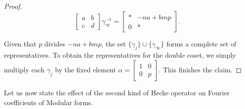 \begin{proof}
\[
\left[\begin{array}{cc}
a & b \\
c & d
\end{array}\right] \gamma_{\infty}^{-1}=\left[\begin{array}{cc}
* & -n a+b m p \\
0 & *
\end{array}\right].
\]

Given that \( p \) divides \( -n a+b m p \), the set \( \{\gamma_{j}\} \cup \{\gamma_{\infty}\} \) forms a complete set of representatives. To obtain the representatives for the double coset, we simply multiply each \( \gamma_{j} \) by the fixed element \( \alpha=\left[\begin{array}{cc}1 & 0 \\ 0 & p\end{array}\right] \). This finishes the claim.

\end{proof}


 Let us now state the effect of the second kind of Hecke operator on Fourier coefficients of Modular forms.

